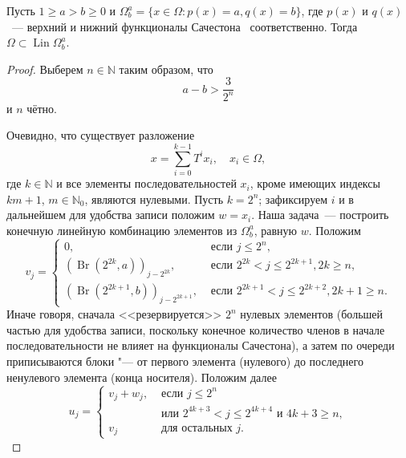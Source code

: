\begin{theorem}
	\label{thm:Lin_Omega_Sucheston}
	Пусть
	$1 \geq a > b \geq 0$ и
	$\Omega^a_b = \{x\in\Omega : p(x) = a, q(x) = b\}$,
	где $p(x)$ и $q(x)$~--- верхний и нижний функционалы Сачестона~\cite{sucheston1967banach} соответственно.
	Тогда $\Omega \subset \operatorname{Lin} \Omega^a_b$.
\end{theorem}

\begin{proof}
	Выберем $n\in\mathbb{N}$ таким образом, что
	\begin{equation}
		\label{eq:Omega_a_b_gap}
		a - b > \frac{3}{2^n}
	\end{equation}
	и $n$ чётно.

	Очевидно, что существует разложение
	\begin{equation}
		x = \sum_{i=0}^{k-1} T^i x_i, \quad x_i \in \Omega
		,
	\end{equation}
	где $k\in\mathbb{N}$ и все элементы последовательностей $x_i$,
	кроме имеющих индексы $km+1$, $m\in\mathbb{N}_0$, являются нулевыми.
	Пусть $k=2^n$; зафиксируем $i$ и в дальнейшем для удобства записи положим $w=x_i$.
	Наша задача~--- построить конечную линейную комбинацию элементов из $\Omega^a_b$, равную $w$.
	Положим
	\begin{equation}
		v_j = \begin{cases}
			0,  & \mbox{~если~} j \leq 2^n,
			\\
			(\operatorname{Br}(2^{2k  },a))_{j-2^{2k  }},  & \mbox{~если~} 2^{2k  } < j \leq 2^{2k+1}, 2k   \geq n,
			\\
			(\operatorname{Br}(2^{2k+1},b))_{j-2^{2k+1}},  & \mbox{~если~} 2^{2k+1} < j \leq 2^{2k+2}, 2k+1 \geq n
			.
		\end{cases}
	\end{equation}
	Иначе говоря, сначала <<резервируется>> $2^n$ нулевых элементов
	(большей частью для удобства записи, поскольку конечное количество членов в начале последовательности
	не влияет на функционалы Сачестона),
	а затем по очереди приписываются блоки "--- от первого элемента (нулевого) до последнего ненулевого элемента
	(конца носителя).
	Положим далее
	\begin{equation}
		u_j = \begin{cases}
			v_j + w_j,  & \mbox{~если~} j \leq 2^n
			\\
			            & \mbox{~или~} 2^{4k+3} < j \leq 2^{4k+4} \mbox{~и~} 4k + 3 \geq n,
			\\
			v_j         & \mbox{~для остальных~} j
			.
		\end{cases}
	\end{equation}


\end{proof}
